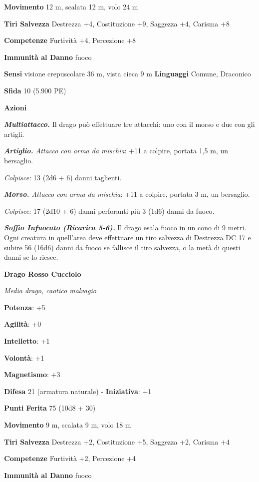 \begin{multicols}{2}
\textbf{Movimento} 12 m, scalata 12 m, volo 24 m

\textbf{Tiri Salvezza} Destrezza +4, Costituzione +9, Saggezza +4,
Carisma +8

\textbf{Competenze} Furtività +4, Percezione +8

\textbf{Immunità al Danno} fuoco

\textbf{Sensi} visione crepuscolare 36 m, vista cieca 9 m
\textbf{Linguaggi} Comune, Draconico

\textbf{Sfida} 10 (5.900 PE)

\textbf{Azioni}

\emph{\textbf{Multiattacco.}} Il drago può effettuare tre attacchi: uno
con il morso e due con gli artigli.

\emph{\textbf{Artiglio.} Attacco con arma da mischia}: +11 a colpire,
portata 1,5 m, un bersaglio.

\emph{Colpisce:} 13 (2d6 + 6) danni taglienti.

\emph{\textbf{Morso.} Attacco con arma da mischia}: +11 a colpire,
portata 3 m, un bersaglio.

\emph{Colpisce:} 17 (2d10 + 6) danni perforanti più 3 (1d6) danni da
fuoco.

\emph{\textbf{Soffio Infuocato (Ricarica 5-6).}} Il drago esala fuoco in
un cono di 9 metri. Ogni creatura in quell'area deve effettuare un tiro
salvezza di Destrezza DC 17 e subire 56 (16d6) danni da fuoco se
fallisce il tiro salvezza, o la metà di questi danni se lo riesce.

\textbf{Drago Rosso Cucciolo}

\emph{Media drago, caotico malvagio}

\textbf{Potenza}: +5

\textbf{Agilità}: +0

\textbf{Intelletto}: +1

\textbf{Volontà}: +1

\textbf{Magnetismo}: +3

\textbf{Difesa} 21 (armatura naturale) - \textbf{Iniziativa}: +1

\textbf{Punti Ferita} 75 (10d8 + 30)

\textbf{Movimento} 9 m, scalata 9 m, volo 18 m

\textbf{Tiri Salvezza} Destrezza +2, Costituzione +5, Saggezza +2,
Carisma +4

\textbf{Competenze} Furtività +2, Percezione +4

\textbf{Immunità al Danno} fuoco


\end{multicols}
